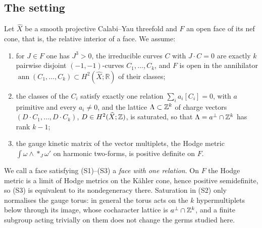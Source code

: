 \subsection{The setting}
\label{subsec:setting}

Let $\widehat X$ be a smooth projective Calabi--Yau threefold and $F$ an open face of its nef
cone, that is, the relative interior of a face. We assume:
\begin{enumerate}
\item[(S1)] for $J\in F$ one has $J^3>0$, the irreducible curves $C$ with $J\cdot C=0$ are exactly $k$ pairwise
 disjoint $(-1,-1)$-curves $C_1,\dots,C_k$, and $F$ is open in the annihilator
 $\operatorname{ann}(C_1,\dots,C_k)\subset H^2(\widehat X;\mathbb R)$ of their classes;
\item[(S2)] the classes of the $C_i$ satisfy exactly one relation $\sum_ia_i[C_i]=0$, with $a$
 primitive and every $a_i\neq0$, and the lattice $\Lambda\subset\mathbb Z^k$ of charge vectors
 $(D\cdot C_1,\dots,D\cdot C_k)$, $D\in H^2(\widehat X;\mathbb Z)$, is saturated, so that
 $\Lambda=a^\perp\cap\mathbb Z^k$ has rank $k-1$;
\item[(S3)] the gauge kinetic matrix of the vector multiplets, the Hodge metric
 $\int\omega\wedge*_J\omega'$ on harmonic two-forms, is positive definite on $F$.
\end{enumerate}
We call a face satisfying (S1)--(S3) a \emph{face with one relation}. On $F$ the Hodge metric is a limit of Hodge metrics on the K\"ahler cone, hence positive
semidefinite, so (S3) is equivalent to its nondegeneracy there. Saturation in (S2) only
normalises the gauge torus: in general the torus acts on the $k$ hypermultiplets below through
its image, whose cocharacter lattice is $a^\perp\cap\mathbb Z^k$, and a finite subgroup acting
trivially on them does not change the germs studied here.

